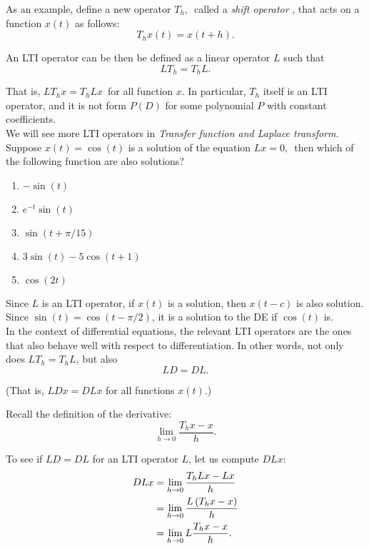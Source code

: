 As an example, define a new operator $T_h, \,$ called a \emph{\color{blue}shift operator },
that acts on a function $x(t)$ as follows:
\begin{equation*}
  T_ h x(t)= x(t+h).
\end{equation*}

An LTI operator can be then be defined as a linear operator $L$ such that
\begin{equation*}
  L T_ h=T_ h L.
\end{equation*}

That is, $L T_ h x= T_ h L x\,$ for all function $x$.
In particular, $T_ h$ itself is an LTI operator, and it is not form
$P(D)$ for some polynomial $P$ with constant coefficients. \\

We will see more LTI operators in \textit{Transfer function and Laplace transform.}\\

Suppose $x(t) = \cos (t)$ is a solution of the equation $Lx = 0,\,$
then which of the following function are also solutions?
\begin{enumerate}
\item $-\sin (t)$
\item $e^{-t}\sin (t)$
\item $\sin (t+\pi /15)$
\item $3\sin (t)-5\cos (t+1)$
\item $\cos (2t)$
\end{enumerate}


Since $L$ is an LTI operator, if $x(t)$ is a solution, then $x(t−c)$ is also solution.
Since $\sin⁡ (t) = \cos⁡ (t−\pi/2)$, it is a solution to the DE if $\cos⁡ (t)$ is. \\

In the context of differential equations,
the relevant LTI operators are the ones that also behave well with respect to differentiation.
In other words, not only does $LT_h=T_h L$, but also
\begin{equation*}
  LD=DL.
\end{equation*}

(That is, $LD x=DL x$ for all functions $x(t)$.)

Recall the definition of the derivative:
\begin{equation*}
  \displaystyle \lim _{h\to 0} \frac{T_ h x-x}{h}.
\end{equation*}

To see if $LD=DL$ for an LTI operator $L$, let us compute $DL x$:
\begin{align*}
  \displaystyle  \displaystyle DLx
  \displaystyle
  &= \displaystyle \lim _{h\to 0} \frac{T_ h Lx-Lx}{h} \\
  \displaystyle
  &= \displaystyle \lim _{h\to 0} \frac{L \left(T_ h x-x\right)}{h} \\
  \displaystyle
  &= \displaystyle \lim _{h\to 0} L \frac{T_ h x-x}{h}.                  
\end{align*}

